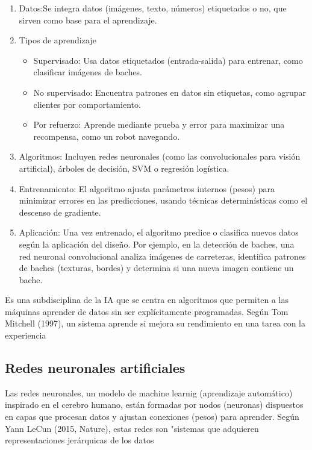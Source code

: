 \begin{enumerate}
	\item Datos:Se integra datos (imágenes, texto, números) etiquetados o no, que sirven como base para el aprendizaje.
	\item Tipos de aprendizaje
	\begin{itemize}
		\item Supervisado: Usa datos etiquetados (entrada-salida) para entrenar, como clasificar imágenes de baches.
		\item No supervisado: Encuentra patrones en datos sin etiquetas, como agrupar clientes por comportamiento.
		\item Por refuerzo: Aprende mediante prueba y error para maximizar una recompensa, como un robot navegando.
	\end{itemize}
	\item Algoritmos: Incluyen redes neuronales (como las convolucionales para visión artificial), árboles de decisión, SVM o regresión logística.
	\item Entrenamiento: El algoritmo ajusta parámetros internos (pesos) para minimizar errores en las predicciones, usando técnicas determinísticas como el descenso de gradiente. 
	\item Aplicación: Una vez entrenado, el algoritmo predice o clasifica nuevos datos según la aplicación del diseño. Por ejemplo, en la detección de baches, una red neuronal convolucional analiza imágenes de carreteras, identifica patrones de baches (texturas, bordes) y determina si una nueva imagen contiene un bache.
\end{enumerate}
Es una subdisciplina de la IA que se centra en algoritmos que permiten a las máquinas aprender de datos sin ser explícitamente programadas. Según Tom Mitchell (1997), un sistema aprende si mejora su rendimiento en una tarea con la experiencia

\subsection{Redes neuronales artificiales}
Las redes neuronales, un modelo de machine learnig (aprendizaje automático) inspirado en el cerebro humano, están formadas por nodos (neuronas) dispuestos en capas que procesan datos y ajustan conexiones (pesos) para aprender. Según Yann LeCun (2015, Nature), estas redes son "sistemas que adquieren representaciones jerárquicas de los datos


